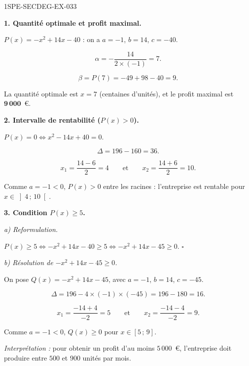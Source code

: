 \begin{corrige}{1SPE-SECDEG-EX-033}

\textbf{1. Quantité optimale et profit maximal.}


$P(x) = -x^2 + 14x - 40$ : on a $a = -1$, $b = 14$, $c = -40$.

\[\alpha = -\frac{14}{2 \times (-1)} = 7.\]

\[\beta = P(7) = -49 + 98 - 40 = 9.\]

La quantité optimale est $x = 7$ (centaines d'unités), et le profit maximal est $\mathbf{9\,000}$~\euro.

\medskip
\textbf{2. Intervalle de rentabilité ($P(x) > 0$).}


$P(x) = 0 \iff x^2 - 14x + 40 = 0$.

\[\Delta = 196 - 160 = 36.\]

\[x_1 = \frac{14 - 6}{2} = 4 \qquad \text{et} \qquad x_2 = \frac{14 + 6}{2} = 10.\]

Comme $a = -1 < 0$, $P(x) > 0$ entre les racines : l'entreprise est rentable pour $x \in \left]4\,;\,10\right[$.

\medskip
\textbf{3. Condition $P(x) \geqslant 5$.}

\textit{a) Reformulation.}


$P(x) \geqslant 5 \iff -x^2 + 14x - 40 \geqslant 5 \iff -x^2 + 14x - 45 \geqslant 0$. \hfill $\square$

\textit{b) Résolution de $-x^2 + 14x - 45 \geqslant 0$.}


On pose $Q(x) = -x^2 + 14x - 45$, avec $a = -1$, $b = 14$, $c = -45$.

\[\Delta = 196 - 4 \times (-1) \times (-45) = 196 - 180 = 16.\]

\[x_1 = \frac{-14 + 4}{-2} = 5 \qquad \text{et} \qquad x_2 = \frac{-14 - 4}{-2} = 9.\]

Comme $a = -1 < 0$, $Q(x) \geqslant 0$ pour $x \in [5\,;\,9]$.

\textit{Interprétation :} pour obtenir un profit d'au moins $5\,000$~\euro, l'entreprise doit produire entre $500$ et $900$ unités par mois.

\end{corrige}
